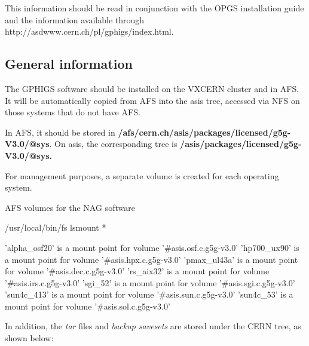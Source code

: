 This information should be read in conjunction with the OPGS installation
guide and the information available through http://asdwww.cern.ch/pl/gphigs/index.html.

\subsection{General information}

The GPHIGS software should be installed on the VXCERN cluster
and in AFS. It will be automatically copied from AFS into the asis
tree, accessed via NFS on those systems that do not have AFS.

In AFS, it should be stored in {\bf /afs/cern.ch/asis/packages/licensed/g5g-V3.0/@sys}.
On asis, the corresponding tree is {\bf /asis/packages/licensed/g5g-V3.0/@sys.}

For management purposes, a separate volume is created for each operating system. 

\begin{XMPt}{AFS volumes for the NAG software}

/usr/local/bin/fs lsmount *

'alpha_osf20' is a mount point for volume '#asis.osf.c.g5g-v3.0'
'hp700_ux90' is a mount point for volume '#asis.hpx.c.g5g-v3.0'
'pmax_ul43a' is a mount point for volume '#asis.dec.c.g5g-v3.0'
'rs_aix32' is a mount point for volume '#asis.irs.c.g5g-v3.0'
'sgi_52' is a mount point for volume '#asis.sgi.c.g5g-v3.0'
'sun4c_413' is a mount point for volume '#asis.sun.c.g5g-v3.0'
'sun4c_53' is a mount point for volume '#asis.sol.c.g5g-v3.0'

\end{XMPt}

In addition, the {\it tar} files and {\it backup savesets} are stored
under the CERN tree, as shown below:

